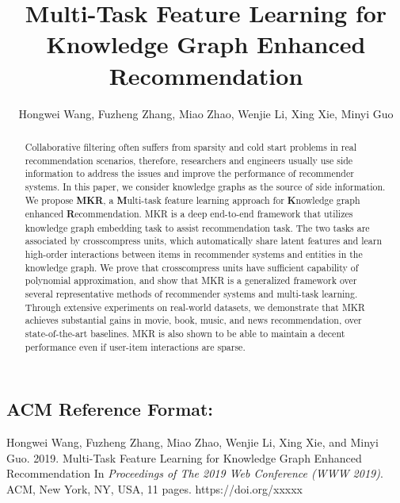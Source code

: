 \documentclass[sigconf]{acmart}
\begin{document}
\title{Multi-Task Feature Learning for Knowledge Graph Enhanced Recommendation}


\author{Hongwei Wang, Fuzheng Zhang, Miao Zhao, Wenjie Li, Xing Xie, Minyi Guo}


\begin{abstract}
	Collaborative filtering often suffers from sparsity and cold start problems in real recommendation scenarios, therefore, researchers and engineers usually use side information to address the issues and improve the performance of recommender systems.
	In this paper, we consider knowledge graphs as the source of side information.
 	We propose \textbf{MKR}, a \textbf{M}ulti-task feature learning approach for \textbf{K}nowledge graph enhanced \textbf{R}ecommendation.
 	MKR is a deep end-to-end framework that utilizes knowledge graph embedding task to assist recommendation task.
 	The two tasks are associated by crosscompress units, which automatically share latent features and learn high-order interactions between items in recommender systems and entities in the knowledge graph.
 	We prove that crosscompress units have sufficient capability of polynomial approximation, and show that MKR is a generalized framework over several representative methods of recommender systems and multi-task learning.
 	Through extensive experiments on real-world datasets, we demonstrate that MKR achieves substantial gains in movie, book, music, and news recommendation, over state-of-the-art baselines.
 	MKR is also shown to be able to maintain a decent performance even if user-item interactions are sparse.
\end{abstract}


\maketitle

\subsection*{\small{ACM Reference Format:}}
\vspace{-0.05in}
	{\small
		Hongwei Wang, Fuzheng Zhang, Miao Zhao, Wenjie Li, Xing Xie, and Minyi Guo.
		2019.
		Multi-Task Feature Learning for Knowledge Graph Enhanced Recommendation
		In \textit{Proceedings of The 2019 Web Conference (WWW 2019)}.
		ACM, New York, NY, USA, 11 pages.
		https://doi.org/xxxxx
	}
\end{document}
